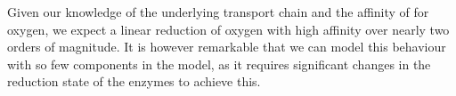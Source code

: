 Given our knowledge of the underlying transport chain and the affinity of \cbbthree{} for oxygen, we expect a linear reduction of oxygen with high affinity over nearly two orders of magnitude. It is however remarkable that we can model this behaviour with so few components in the model, as it requires significant changes in the reduction state of the enzymes to achieve this.